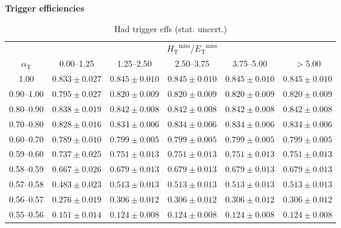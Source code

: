 \documentclass[portrait,a4paper]{article}
\begin{document}
\renewcommand{\arraystretch}{1.3}
\newcommand\AlphaT{\ensuremath{\alpha_{\textrm{T}}}}
\newcommand\HT{\ensuremath{H_{\textrm{T}}}}
\newcommand\ET{\ensuremath{E_{\textrm{T}}}}
\newcommand\MHT{\ensuremath{\HT^{\textrm{miss}}}}
\newcommand\MET{\ensuremath{\ET^{\textrm{miss}}}}
\newcommand\stat{\ensuremath{{\,\textrm{(stat)}\,}}}
\newcommand\syst{\ensuremath{{\,\textrm{(syst)}\,}}}
\newcommand{\fixedpoint}[5]{\ensuremath{#1^{+#2}_{-#3}{}^{+#4}_{-#5}}}
\newcommand{\scientific}[6]{\ensuremath{(#2^{+#3}_{-#4}{}^{+#5}_{-#6})\cdot10^{#1}}}
\newcommand{\zero}{\entry{0}{0}{0}{0}{0}}

\centerline{\LARGE\bf Trigger efficiencies}

\begin{table}[h!]
\centering
\scriptsize
\caption{Had trigger effs (stat. uncert.)}
\label{tab:test}
\begin{tabular}{cccccc}
\hline
& \multicolumn{5}{c}{\MHT/\MET} \\[0.1cm]
\cline{2-6}
\AlphaT & 0.00--1.25 & 1.25--2.50 & 2.50--3.75 & 3.75--5.00 & $>$5.00 \\
\hline
1.00 & $0.833 \pm 0.027$ & $0.845 \pm 0.010$ & $0.845 \pm 0.010$ & $0.845 \pm 0.010$ & $0.845 \pm 0.010$ \\
0.90--1.00 & $0.795 \pm 0.027$ & $0.820 \pm 0.009$ & $0.820 \pm 0.009$ & $0.820 \pm 0.009$ & $0.820 \pm 0.009$ \\
0.80--0.90 & $0.838 \pm 0.019$ & $0.842 \pm 0.008$ & $0.842 \pm 0.008$ & $0.842 \pm 0.008$ & $0.842 \pm 0.008$ \\
0.70--0.80 & $0.828 \pm 0.016$ & $0.834 \pm 0.006$ & $0.834 \pm 0.006$ & $0.834 \pm 0.006$ & $0.834 \pm 0.006$ \\
0.60--0.70 & $0.789 \pm 0.010$ & $0.799 \pm 0.005$ & $0.799 \pm 0.005$ & $0.799 \pm 0.005$ & $0.799 \pm 0.005$ \\
0.59--0.60 & $0.737 \pm 0.025$ & $0.751 \pm 0.013$ & $0.751 \pm 0.013$ & $0.751 \pm 0.013$ & $0.751 \pm 0.013$ \\
0.58--0.59 & $0.667 \pm 0.026$ & $0.679 \pm 0.013$ & $0.679 \pm 0.013$ & $0.679 \pm 0.013$ & $0.679 \pm 0.013$ \\
0.57--0.58 & $0.483 \pm 0.023$ & $0.513 \pm 0.013$ & $0.513 \pm 0.013$ & $0.513 \pm 0.013$ & $0.513 \pm 0.013$ \\
0.56--0.57 & $0.276 \pm 0.019$ & $0.306 \pm 0.012$ & $0.306 \pm 0.012$ & $0.306 \pm 0.012$ & $0.306 \pm 0.012$ \\
0.55--0.56 & $0.151 \pm 0.014$ & $0.124 \pm 0.008$ & $0.124 \pm 0.008$ & $0.124 \pm 0.008$ & $0.124 \pm 0.008$ \\

\end{tabular}
\end{table}
\end{document}
